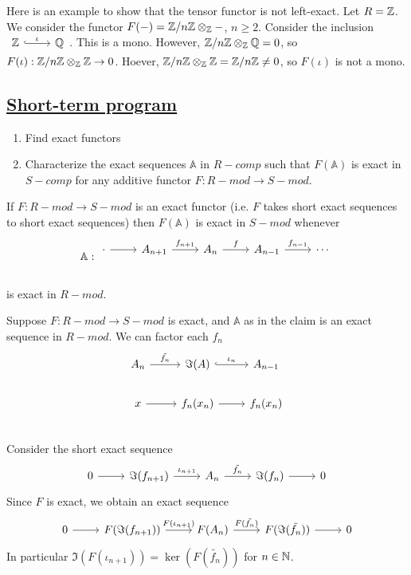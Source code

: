 \documentclass[x11names,reqno,14pt]{extarticle}
\newcommand{\A}{\mathbb{A}}
\begin{document}
\exm

Here is an example to show that the tensor functor is not left-exact. Let $R = \mathbb{Z}$. We consider the functor $F(-) = \mathbb{Z}/n\mathbb{Z}\otimes_{\mathbb{Z}}-$, $n \geq 2$. Consider the inclusion $\begin{tikzcd} \Z\ar[r, hook, "\iota"]&\Q \end{tikzcd}$. This is a mono. However, $\mathbb{Z}/n\mathbb{Z}\otimes_{\mathbb{Z}}\mathbb{Q}=0$, so $F(\iota):\mathbb{Z}/n\mathbb{Z}\otimes_{\mathbb{Z}}\mathbb{Z}\to0$. Hoever, $\mathbb{Z}/n\mathbb{Z}\otimes_{\mathbb{Z}}\mathbb{Z} = \mathbb{Z}/n\mathbb{Z} \neq 0$, so $F(\iota)$ is not a mono. 

\subsection*{\underline{Short-term program}}

\begin{enumerate}

\item Find exact functors 

\item Characterize the exact sequences $\A$ in $R-comp$ such that $F(\A)$ is exact in $S-comp$ for any additive functor $F:R-mod\to S-mod$. 

\end{enumerate}

\thm

If $F:R-mod\to S-mod$ is an exact functor (i.e. $F$ takes short exact sequences to short exact sequences) then $F(\A)$ is exact in $S-mod$ whenever
\[\A:
\begin{tikzcd}
\cdot\ar[r]&A_{n + 1}\ar[r, "f_{n + 1}"]& A_n\ar[r, "f"]& A_{n - 1} \ar[r, "f_{n - 1}"]&\cdots \\ 
\end{tikzcd}
\]
is exact in $R-mod$. 

\proof

Suppose $F:R-mod\to S-mod$ is exact, and $\A$ as in the claim is an exact sequence in $R-mod$. We can factor each $f_n$ 
\[
\begin{tikzcd}
A_n\ar[r, "\tilde{f_n}"]&\Im(A)\ar[r, hook, "\iota_n"]& A_{n - 1} \\
x\ar[r]&f_n(x_n)\ar[r]&f_n(x_n) \\
\end{tikzcd}
\]
Consider the short exact sequence 
\[
\exactshort{\Im(f_{n + 1})}{\iota_{n + 1}}{A_n}{\tilde{f_n}}{\Im(f_n)}
\]
Since $F$ is exact, we obtain an exact sequence
\[
\exactshort{F(\Im(f_{n + 1}))}{F(\iota_{n + 1})}{F(A_n)}{F(\tilde{f_n})}{F(\Im(\tilde{f_n}))}
\]
In particular $\Im(F(\iota_{n + 1})) = \ker(F(\tilde{f_n}))$ for $n \in \mathbb{N}$. 
\end{document}
